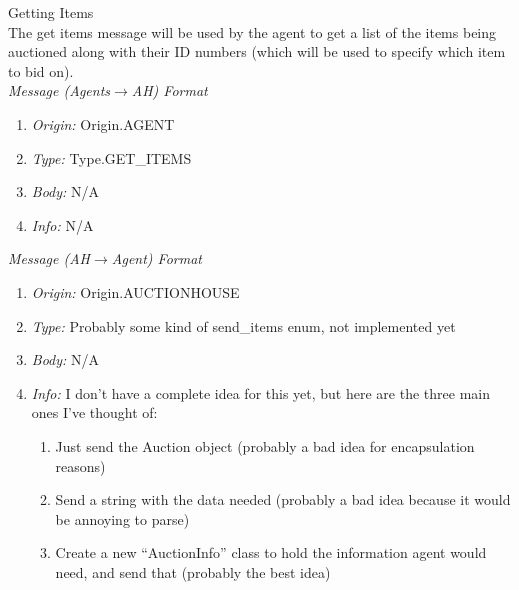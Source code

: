 \documentclass{article}
\begin{document}
\large 
Getting Items 
\normalsize
\\The get items message will be used by the agent to get a list of the items being auctioned along with their ID numbers (which will be used to specify which item to bid on). 
\footnotesize
\\\emph{Message (Agents$\to$AH) Format} 
\begin{enumerate}
	\item[]\emph{Origin:} Origin.AGENT 
	\item[]\emph{Type: } Type.GET\_ITEMS
	\item[]\emph{Body: } N/A
	\item[]\emph{Info: } N/A 
\end{enumerate} 
\emph{Message (AH$\to$Agent) Format} 
\begin{enumerate}
	\item[]\emph{Origin:} Origin.AUCTIONHOUSE
	\item[]\emph{Type:} Probably some kind of send\_items enum, not implemented yet
	\item[]\emph{Body:} N/A
	\item[]\emph{Info:} I don't have a complete idea for this yet, but here are the three main ones I've thought of: 
		\begin{enumerate}
			\item Just send the Auction object (probably a bad idea for encapsulation reasons) 
			\item Send a string with the data needed (probably a bad idea because it would be annoying to parse) 
			\item Create a new ``AuctionInfo'' class to hold the information agent would need, and send that (probably the best idea) 
		\end{enumerate}
\end{enumerate} 

\vspace{1cm} 
\end{document}
